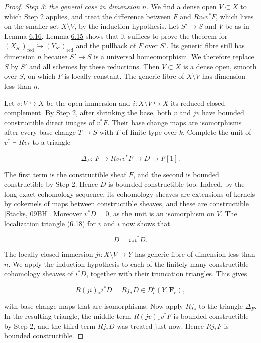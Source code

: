 \documentclass[11pt]{article}
\providecommand{\Dbc}{}\renewcommand{\Dbc}{D^b_c}
\providecommand{\Fell}{}\renewcommand{\Fell}{\mathbf F_\ell}
\begin{document}
\begin{proof}[{Proof}]
\emph{Step 3: the general case in dimension \(n\).} We find a dense open \(V\subset X\) to which Step 2 applies, and treat the difference between \(F\) and \(Rv_*v^*F\), which lives on the smaller set \(X\setminus V\), by the induction hypothesis. Let \(S'\to S\) and \(V\) be as in Lemma \hyperref[bp561]{6.16}. Lemma \hyperref[bp559]{6.15} shows that it suffices to prove the theorem for \((X_{S'})_{\mathrm{red}}\hookrightarrow(Y_{S'})_{\mathrm{red}}\) and the pullback of \(F\) over \(S'\). Its generic fibre still has dimension \(n\) because \(S'\to S\) is a universal homeomorphism. We therefore replace \(S\) by \(S'\) and all schemes by these reductions. Then \(V\subset X\) is a dense open, smooth over \(S\), on which \(F\) is locally constant. The generic fibre of \(X\setminus V\) has dimension less than \(n\).

Let \(v:V\hookrightarrow X\) be the open immersion and \(i:X\setminus V\hookrightarrow X\) its reduced closed complement. By Step 2, after shrinking the base, both \(v\) and \(jv\) have bounded constructible direct images of \(v^*F\). Their base change maps are isomorphisms after every base change \(T\to S\) with \(T\) of finite type over \(k\). Complete the unit of \(v^*\dashv Rv_*\) to a triangle

\[
\Delta_F:\ F\longrightarrow Rv_*v^*F\longrightarrow D
\longrightarrow F[1].
\tag{6.21}
\]

The first term is the constructible sheaf \(F\), and the second is bounded constructible by Step 2. Hence \(D\) is bounded constructible too. Indeed, by the long exact cohomology sequence, its cohomology sheaves are extensions of kernels by cokernels of maps between constructible sheaves, and these are constructible [Stacks, \href{https://stacks.math.columbia.edu/tag/09BH}{09BH}]. Moreover \(v^*D=0\), as the unit is an isomorphism on \(V\). The localization triangle (6.18) for \(v\) and \(i\) now shows that

\[
D=i_*i^*D.
\]

The locally closed immersion \(ji:X\setminus V\to Y\) has generic fibre of dimension less than \(n\). We apply the induction hypothesis to each of the finitely many constructible cohomology sheaves of \(i^*D\), together with their truncation triangles. This gives

\[
R(ji)_*i^*D=Rj_*D\in\Dbc(Y,\Fell),
\]

with base change maps that are isomorphisms. Now apply \(Rj_*\) to the triangle \(\Delta_F\). In the resulting triangle, the middle term \(R(jv)_*v^*F\) is bounded constructible by Step 2, and the third term \(Rj_*D\) was treated just now. Hence \(Rj_*F\) is bounded constructible.


\end{proof}
\end{document}

